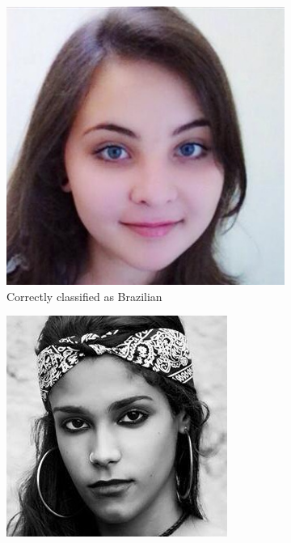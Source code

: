 \begin{figure}
    \centering
    \begin{subfigure}[b]{0.3\textwidth}
      \includegraphics[width=\textwidth]{figures/results/misclassification/brazil-brazil.jpg}
      \caption{Correctly classified as Brazilian}
    \end{subfigure}
    \begin{subfigure}[b]{0.3\textwidth}
      \includegraphics[width=\textwidth]{figures/results/misclassification/brazil-india.jpg}

\end{subfigure}
\end{figure}
